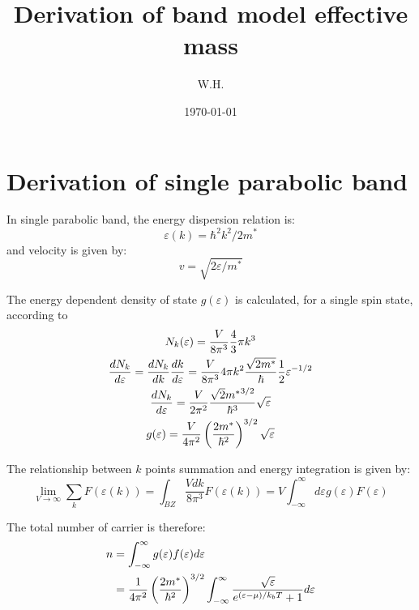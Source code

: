 \documentclass{article}
\begin{document}
\title{Derivation of band model effective mass}
\date{\today}
\author{W.H.}
\maketitle

\section{Derivation of single parabolic band}
In single parabolic band, the energy dispersion relation is:
\begin{equation}
    \varepsilon(k) = \hbar^2 k^2 / 2m^*
\end{equation}
and velocity is given by:
\begin{equation}
    v =\sqrt{2\varepsilon/m^* }
\end{equation}

The energy dependent density of state $g(\varepsilon)$ is calculated, for a single spin state,
according to
\begin{gather}
    N_k(\varepsilon) = \frac{V}{8\pi^3} \frac{4}{3} \pi k^3 \notag \\
    \frac{dN_k}{d\varepsilon} = \frac{dN_k}{dk} \frac{dk}{d\varepsilon} 
            = \frac{V}{8\pi^3} 4\pi k^2 \frac{\sqrt{2m^*}}{\hbar} \frac{1}{2} \varepsilon^{-1/2} \\
    \frac{dN_k}{d\varepsilon} = \frac{V}{2\pi^2} \frac{\sqrt{2}{m^*}^{3/2}}{\hbar^3} \sqrt{\varepsilon } \\
    g(\varepsilon) = \frac{V}{4\pi^2} \left( \frac{2m^*}{\hbar^2} \right)^{3/2} \sqrt{\varepsilon }
\end{gather}

The relationship between $k$ points summation and energy integration is given by:
\begin{equation}
    \lim_{V \to \infty } \sum_k F(\varepsilon(k)) = \int_{BZ} \frac{Vdk}{8\pi^3}  F(\varepsilon(k)) 
        =V \int_{-\infty}^{\infty} d\varepsilon g(\varepsilon)F(\varepsilon)
\end{equation}

The total number of carrier is therefore:
\begin{align}
    n &= \int_{-\infty}^{\infty} g(\varepsilon)f(\varepsilon) d\varepsilon \notag \\
      &= \frac{1}{4\pi^2} \left( \frac{2m^*}{\hbar^2} \right)^{3/2} \int_{-\infty}^{\infty} \frac{\sqrt{\varepsilon}}{e^{(\varepsilon - \mu)/k_b T}+1} d\varepsilon
\end{align}
\end{document}
